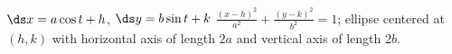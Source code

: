 {$\ds x=a\cos t+h$, \quad $\ds y=b\sin t+k$
}
{$\frac{(x-h)^2}{a^2}+\frac{(y-k)^2}{b^2}=1$; ellipse centered at $(h,k)$ with horizontal axis of length $2a$ and vertical axis of length $2b$.
}